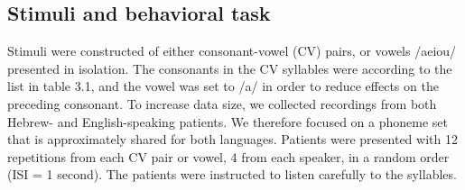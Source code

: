\subsection{Stimuli and behavioral task}
Stimuli were constructed of either consonant-vowel (CV) pairs, or vowels /aeiou/ presented in isolation. The consonants in the CV syllables were according to the list in table 3.1, and the vowel was set to /a/ in order to reduce effects on the preceding consonant. To increase data size, we collected recordings from both Hebrew- and English-speaking patients. We therefore focused on a phoneme set that is approximately shared for both languages. Patients  were presented with 12 repetitions from each CV pair or vowel, 4 from each speaker, in a random order (ISI = 1 second). The patients were instructed to listen carefully to the syllables.


